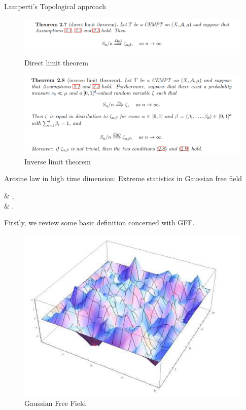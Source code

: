 \documentclass{beamer}
\begin{document}
\begin{frame}{Lamperti's Topological approach}
    	\begin{figure}[H]
	\centering
  	\includegraphics[width=\linewidth]{multi2.png}
  	\caption{Direct limit theorem}
  	\label{multi-direct}
	\end{figure}
	\begin{figure}[H]
	\centering
  	\includegraphics[width=\linewidth]{multi3.png}
  	\caption{Inverse limit theorem}
  	\label{multi-inv}
	\end{figure}
\end{frame}


\begin{frame}{Arcsine law in high time dimension: Extreme statistics in Gaussian free field}
	\par
	\bequn
		\begin{aligned}
			 & \Longrightarrow  {},		\\
			 & \Longrightarrow  {}.
		\end{aligned}
	\eequn
	Firstly, we review some basic definition concerned with GFF. 
	\begin{figure}[H]
	\centering
  	\includegraphics[width=0.45\linewidth]{GFF.png}
  	\caption{Gaussian Free Field}
  	\label{GFF}
	\end{figure}
\end{frame}
\end{document}
